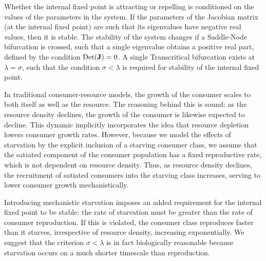 \documentclass[11pt]{article}
\begin{document}
Whether the internal fixed point is attracting or repelling is conditioned
on the values of the parameters in the system.  If the parameters of the
Jacobian matrix (at the internal fixed point) are such that its eigenvalues
have negative real values, then it is stable.  The stability of the system
changes if a Saddle-Node bifurcation is crossed, such that a single
eigenvalue obtains a positive real part, defined by the condition
${\rm Det}({\bf J})=0$.  A single Transcritical bifurcation exists at
$\lambda = \sigma$, such that the condition $\sigma < \lambda$ is required for stability of the internal fixed point.

In traditional consumer-resource models, the growth of the consumer scales to both itself as well as the resource.
The reasoning behind this is sound: as the resource density declines, the growth of the consumer is likewise expected to decline.
This dynamic implicitly incorporates the idea that resource depletion lowers consumer growth rates.
However, because we model the effects of starvation by the explicit inclusion of a starving consumer class, we assume that the satiated component of the consumer population has a fixed reproductive rate, which is not dependent on resource density.
Thus, as resource density declines, the recruitment of satiated consumers into the starving class increases, serving to lower consumer growth mechanistically.

Introducing mechanistic starvation imposes an added requirement for the internal fixed point to be stable: the rate of starvation must be greater than the rate of consumer reproduction.
If this is violated, the consumer class reproduces faster than it starves, irrespective of resource density, increasing exponentially.
We suggest that the criterion $\sigma < \lambda$ is in fact biologically reasonable because starvation occurs on a much shorter timescale than reproduction.



\end{document}
